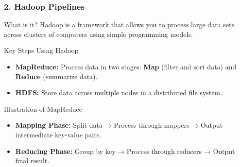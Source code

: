 \documentclass[aspectratio=169]{beamer}
\begin{document}
\begin{frame}
    \frametitle{2. Hadoop Pipelines}
    \begin{block}{What is it?}
        Hadoop is a framework that allows you to process large data sets across clusters of computers using simple programming models.
    \end{block}
    
    \begin{block}{Key Steps Using Hadoop}
        \begin{itemize}
            \item \textbf{MapReduce:} Process data in two stages: \textbf{Map} (filter and sort data) and \textbf{Reduce} (summarize data).
            \item \textbf{HDFS:} Store data across multiple nodes in a distributed file system.
        \end{itemize}
    \end{block}
    
    \begin{block}{Illustration of MapReduce}
        \begin{itemize}
            \item \textbf{Mapping Phase:} Split data → Process through mappers → Output intermediate key-value pairs.
            \item \textbf{Reducing Phase:} Group by key → Process through reducers → Output final result.
        \end{itemize}
    \end{block}
\end{frame}
\end{document}
